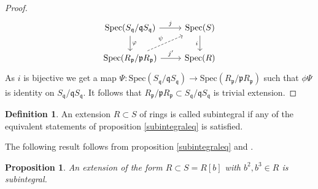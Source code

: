 \documentclass[11pt,a4paper]{amsart}
\theoremstyle{plain}
\newtheorem{prop}[thm]{Proposition}
\theoremstyle{definition}
\newtheorem{defn}[thm]{Definition}
\theoremstyle{remark}
\begin{document}
\begin{proof}
\[\begin{tikzcd}
	{\text{Spec}(S_{\mathfrak{q}}/\mathfrak{q}S_\mathfrak{q})} & {\text{Spec}(S)} \\
	{\text{Spec}(R_{\mathfrak{p}}/\mathfrak{p}R_\mathfrak{p})} & {\text{Spec}(R)}
	\arrow["j", from=1-1, to=1-2]
	\arrow["\varphi", from=1-1, to=2-1]
	\arrow["i"', from=1-2, to=2-2]
	\arrow["\psi", dashed, from=2-1, to=1-2]
	\arrow["{j'}", from=2-1, to=2-2]
\end{tikzcd}\]
As $i$ is bijective we get a map $\Psi: \text{Spec}(S_{\mathfrak{q}}/\mathfrak{q}S_\mathfrak{q})\xrightarrow[]{} \text{Spec}(R_{\mathfrak{p}}/\mathfrak{p}R_\mathfrak{p})$ such that $\phi\Psi$ is identity on $S_{\mathfrak{q}}/\mathfrak{q}S_\mathfrak{q}$. It follows that $R_{\mathfrak{p}}/ \mathfrak{p} R_{\mathfrak{p}} \subset S_{\mathfrak{q}}/{\mathfrak{q} S_{\mathfrak{q}}}$ is trivial extension.
\end{proof}
\fi
\begin{defn}\label{subintdefn}
    An extension $R\subset S$ of rings is called subintegral if any of the equivalent statements of proposition \ref{subintegraleq} is satisfied.
\end{defn}
 The following result follows from proposition \ref{subintegraleq} and \cite[Lemma 4.4]{swan1980seminormality}. 
\begin{prop}\label{elementarysub}
  An extension of the form $R\subset S=R[b]$ with $b^2,b^3\in R$ is subintegral.
\end{prop}
\iffalse
\end{document}
